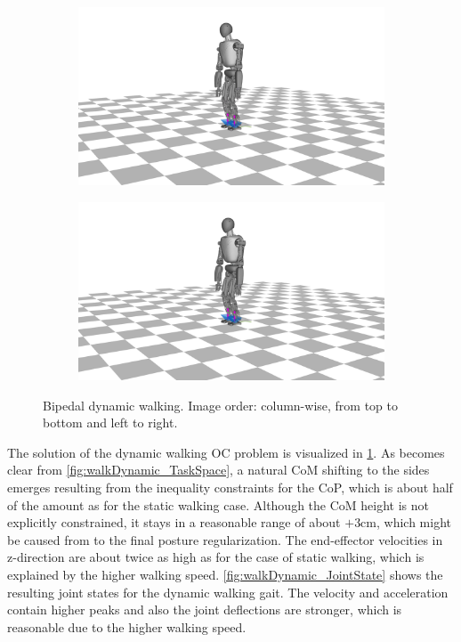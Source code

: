 \begin{figure}[h!]
\begin{subfigure}{.5\textwidth}
	\includegraphics[width=1\linewidth]{fig/walkDynamic/snaps/7}
	\caption{}
\end{subfigure}%
\begin{subfigure}{.5\textwidth}
	\includegraphics[width=1\linewidth]{fig/walkDynamic/snaps/8}
	\caption{}
\end{subfigure}
\caption{Bipedal dynamic walking. Image order: column-wise,
from top to bottom and left to right.}
\label{fig:walkDynamic_Snaps}
\end{figure}

The solution of the dynamic walking \gls{OC} problem is visualized in \cref{fig:walkDynamic_Snaps}. As becomes clear from \cref{fig:walkDynamic_TaskSpace}, a natural \gls{CoM} shifting to the sides emerges resulting from the inequality constraints for the \gls{CoP}, which is about half of the amount as for the static walking case. Although the \gls{CoM} height is not explicitly constrained, it stays in a reasonable range of about $+$3cm, which might be caused from to the final posture regularization. The end-effector velocities in z-direction are about twice as high as for the case of static walking, which is explained by the higher walking speed. 
\cref{fig:walkDynamic_JointState} shows the resulting joint states for the dynamic walking gait. The velocity and acceleration contain higher peaks and also the joint deflections are stronger, which is reasonable due to the higher walking speed.       

